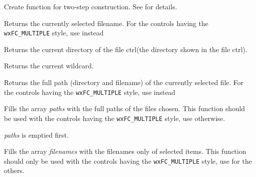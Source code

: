 Create function for two-step construction. See  for details.

\label{wxfilectrlgetfilename}


Returns the currently selected filename.
For the controls having the {\tt wxFC\_MULTIPLE} style, use 
instead

\label{wxfilectrlgetdirectory}


Returns the current directory of the file ctrl(the directory shown in the file ctrl).

\label{wxfilectrlgetwildcard}


Returns the current wildcard.

\label{wxfilectrlgetpath}


Returns the full path (directory and filename) of the currently selected file.
For the controls having the {\tt wxFC\_MULTIPLE} style, use 
instead

\label{wxfilectrlgetpaths}


Fills the array {\it paths} with the full paths of the files chosen. This
function should be used with the controls having the {\tt wxFC\_MULTIPLE} style,
use  otherwise.


{\it paths} is emptied first.

\label{wxfilectrlgetfilenames}


Fills the array {\it filenames} with the filenames only of selected items. This
function should only be used with the controls having the {\tt wxFC\_MULTIPLE} style,
use  for the others.


